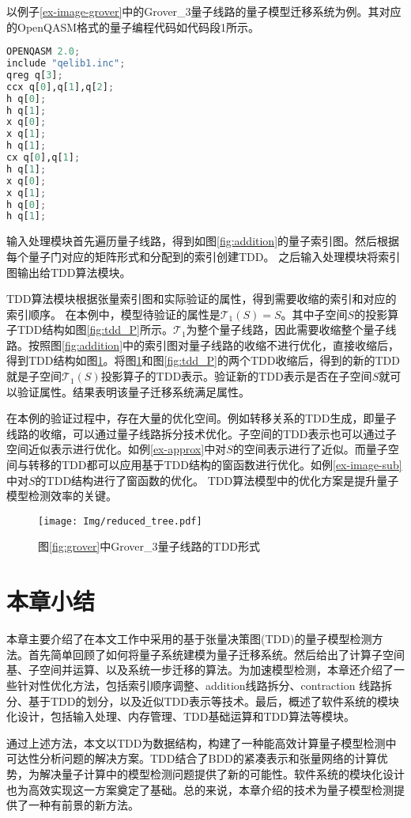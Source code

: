 \begin{example}
    以例子\ref{ex-image-grover}中的Grover\_3量子线路的量子模型迁移系统为例。其对应的OpenQASM格式的量子编程代码如代码段1所示。
\begin{lstlisting}[language=Python, caption={Grover\_3量子线路的QASM代码}]
OPENQASM 2.0;
include "qelib1.inc";
qreg q[3];
ccx q[0],q[1],q[2];
h q[0];
h q[1];
x q[0];
x q[1];
h q[1];
cx q[0],q[1];
h q[1];
x q[0];
x q[1];
h q[0];
h q[1];
\end{lstlisting}
输入处理模块首先遍历量子线路，得到如图\ref{fig:addition}的量子索引图。然后根据每个量子门对应的矩阵形式和分配到的索引创建TDD。
之后输入处理模块将索引图输出给TDD算法模块。

TDD算法模块根据张量索引图和实际验证的属性，得到需要收缩的索引和对应的索引顺序。
在本例中，模型待验证的属性是\(\mathcal{T}_1(S)=S\)。其中子空间\(S\)的投影算子TDD结构如图\ref{fig:tdd_P}所示。\(\mathcal{T}_1\)为整个量子线路，因此需要收缩整个量子线路。按照图\ref{fig:addition}中的索引图对量子线路的收缩不进行优化，直接收缩后，得到TDD结构如图\ref{fig-tdd-grover}。将图\ref{fig-tdd-grover}和图\ref{fig:tdd_P}的两个TDD收缩后，得到的新的TDD就是子空间\(\mathcal{T}_1(S)\)投影算子的TDD表示。验证新的TDD表示是否在子空间\(S\)就可以验证属性。结果表明该量子迁移系统满足属性。

在本例的验证过程中，存在大量的优化空间。例如转移关系的TDD生成，即量子线路的收缩，可以通过量子线路拆分技术优化。子空间的TDD表示也可以通过子空间近似表示进行优化。如例\ref{ex-approx}中对\(S\)的空间表示进行了近似。而量子空间与转移的TDD都可以应用基于TDD结构的窗函数进行优化。如例\ref{ex-image-sub}中对\(S\)的TDD结构进行了窗函数的优化。
TDD算法模型中的优化方案是提升量子模型检测效率的关键。
\begin{figure}[htbp]
    \centering
    \texttt{[image: Img/reduced\_tree.pdf]}
    \caption{图\ref{fig:grover}中Grover\_3量子线路的TDD形式}
    \label{fig-tdd-grover}
\end{figure}
\end{example}
\section{本章小结}
本章主要介绍了在本文工作中采用的基于张量决策图(TDD)的量子模型检测方法。首先简单回顾了如何将量子系统建模为量子迁移系统。然后给出了计算子空间基、子空间并运算、以及系统一步迁移的算法。为加速模型检测，本章还介绍了一些针对性优化方法，包括索引顺序调整、addition线路拆分、contraction 线路拆分、基于TDD的划分，以及近似TDD表示等技术。最后，概述了软件系统的模块化设计，包括输入处理、内存管理、TDD基础运算和TDD算法等模块。

通过上述方法，本文以TDD为数据结构，构建了一种能高效计算量子模型检测中可达性分析问题的解决方案。TDD结合了BDD的紧凑表示和张量网络的计算优势，为解决量子计算中的模型检测问题提供了新的可能性。软件系统的模块化设计也为高效实现这一方案奠定了基础。总的来说，本章介绍的技术为量子模型检测提供了一种有前景的新方法。